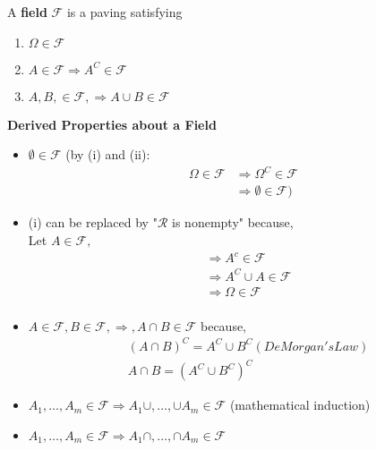 \documentclass[11pt,fleqn]{book} %
\begin{document}
\begin{definition}[Field] A \textbf{field} $\mathscr{F}$ is a paving satisfying
	\begin{enumerate}[label = (\roman*)]
		\item $\Omega \in \mathscr{F}$
		\item $A \in \mathscr{F} \Rightarrow A^C \in \mathscr{F}$
		\item $A, B, \in \mathscr{F}, \Rightarrow A \cup B \in \mathscr{F}$
	\end{enumerate}
	
\end{definition}

\textbf{Derived Properties about a Field }

\begin{itemize}
	\item $\emptyset \in \mathscr{F}$ 
		(by (i) and (ii): 
		\begin{align*}
			\Omega \in \mathscr{F} &\Rightarrow \Omega^C \in \mathscr{F}\\
			&\Rightarrow \emptyset \in \mathscr{F})
		\end{align*}
			
	\item (i) can be replaced by "$\mathscr{R}$ is nonempty" because,\\ 
		Let $A \in \mathscr{F}, $
			\begin{align*}
				&\Rightarrow A^c \in \mathscr{F}\\
			&\Rightarrow A^C \cup A \in \mathscr{F}\\
			&\Rightarrow \Omega \in \mathscr{F}\\
			\end{align*}
			
	\item $A \in \mathscr{F}, B \in \mathscr{F}, \Rightarrow, A\cap B \in \mathscr{F}$ 
	because, \\
		\begin{align*}
		&(A\cap B)^C = A^C \cup B^C (DeMorgan's Law)\\
		&A \cap B = (A^C \cup B^C)^C	
		\end{align*}
		

	\item $A_1, \dots, A_m \in \mathscr{F} \Rightarrow A_1 \cup, \dots, \cup A_m \in \mathscr{F} $ (mathematical induction)
	\item$A_1, \dots, A_m \in \mathscr{F} \Rightarrow A_1 \cap, \dots, \cap A_m \in \mathscr{F} $ 
\end{itemize}
\end{document}
